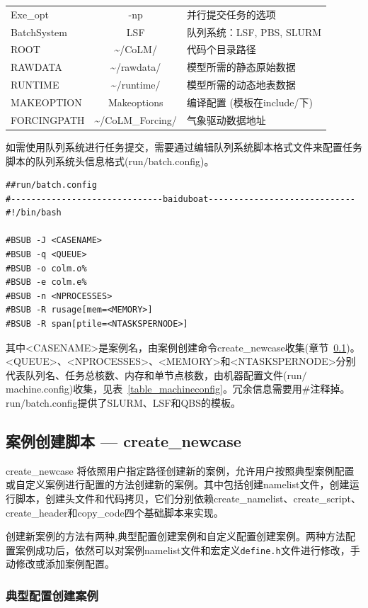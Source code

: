 \begin{table}[!htbp]
\begin{tabular}{lcp{}}
Exe\_opt & -np & 并行提交任务的选项 \\
BatchSystem & LSF & 队列系统：LSF, PBS, SLURM \\
ROOT & \textasciitilde/CoLM/ & 代码个目录路径 \\
RAWDATA & \textasciitilde/rawdata/ & 模型所需的静态原始数据 \\
RUNTIME & \textasciitilde/runtime/ & 模型所需的动态地表数据 \\
MAKEOPTION & Makeoptions & 编译配置 (模板在include/下) \\
FORCINGPATH & \textasciitilde/CoLM\_Forcing/ &气象驱动数据地址 \\
\bottomrule
\end{tabular}
\end{table}

如需使用队列系统进行任务提交，需要通过编辑队列系统脚本格式文件来配置任务脚本的队列系统头信息格式(run$\slash$batch.config)。

\begin{lstlisting}
##run/batch.config
#------------------------------baiduboat-----------------------------
#!/bin/bash

#BSUB -J <CASENAME>
#BSUB -q <QUEUE>
#BSUB -o colm.o%
#BSUB -e colm.e%
#BSUB -n <NPROCESSES>
#BSUB -R rusage[mem=<MEMORY>]
#BSUB -R span[ptile=<NTASKSPERNODE>]
\end{lstlisting}

其中<CASENAME>是案例名，由案例创建命令create\_newcase收集(章节~\ref{CreateNewcase})。<QUEUE>、<NPROCESSES>、<MEMORY>和<NTASKSPERNODE>分别代表队列名、任务总核数、内存和单节点核数，由机器配置文件(run$\slash$machine.config)收集，见表~\ref{table_machineconfig}。冗余信息需要用\#注释掉。run$\slash$batch.config提供了SLURM、LSF和QBS的模板。

\subsection{案例创建脚本 --- create\_newcase} \label{CreateNewcase}
create\_newcase 将依照用户指定路径创建新的案例，允许用户按照典型案例配置或自定义案例进行配置的方法创建新的案例。其中包括创建namelist文件，创建运行脚本，创建头文件和代码拷贝，它们分别依赖create\_namelist、create\_script、create\_header和copy\_code四个基础脚本来实现。

创建新案例的方法有两种,典型配置创建案例和自定义配置创建案例。两种方法配置案例成功后，依然可以对案例namelist文件和宏定义\texttt{define.h}文件进行修改，手动修改或添加案例配置。

\subsubsection{典型配置创建案例}

